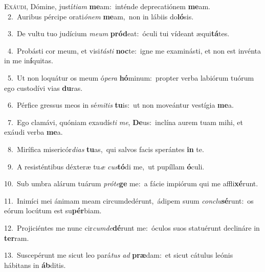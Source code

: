 \lettrine{\initial\textcolor{\initialcolor}{E}}{xáudi,} Dómine, justí\-\textit{ti}\-\textit{am} \textbf{me}\-am:~\star inténde deprecatiónem \textbf{me}\-am.\\
{\numbfont\textcolor{\numbcolor}{~2.}}~Auribus pércipe orati\-\textit{ó}\-\textit{nem} \textbf{me}\-am,~\star non in lábiis do\-\textbf{ló}\-sis.\par
{\numbfont\textcolor{\numbcolor}{~3.}}~De vultu tuo judícium \textit{me}\-\textit{um} \textbf{pród}\-eat:~\star óculi tui vídeant æqui\-\textbf{tá}\-tes.\par
{\numbfont\textcolor{\numbcolor}{~4.}}~Probásti cor meum, et visi\-\textit{tás}\-\textit{ti} \textbf{noc}\-te:~\star igne me examinásti, et non est invénta in me in\-\textbf{í}\-quitas.\par
{\numbfont\textcolor{\numbcolor}{~5.}}~Ut non loquátur os meum ó\-\textit{pe}\-\textit{ra} \textbf{hó}\-minum:~\star propter verba labiórum tuórum ego custodívi vias \textbf{du}\-ras.\par
{\numbfont\textcolor{\numbcolor}{~6.}}~Pérfice gressus meos in sé\-\textit{mi}\-\textit{tis} \textbf{tu}\-is:~\star ut non moveántur vestígia \textbf{me}\-a.\par
{\numbfont\textcolor{\numbcolor}{~7.}}~Ego clamávi, quóniam exaudís\textit{ti} \textit{me}\-, \textbf{De}\-us:~\star inclína aurem tuam mihi, et exáudi verba \textbf{me}\-a.\par
{\numbfont\textcolor{\numbcolor}{~8.}}~Mirífica misericór\-\textit{di}\-\textit{as} \textbf{tu}\-as,~\star qui salvos facis sperántes \textbf{in} te.\par
{\numbfont\textcolor{\numbcolor}{~9.}}~A resisténtibus déxteræ tu\textit{æ} \textit{cus}\-\textbf{tó}di me,~\star ut pupíllam \textbf{ó}\-culi.\par
{\numbfont\textcolor{\numbcolor}{10.}}~Sub umbra alárum tuárum \textit{pró}\-\textit{te}\textbf{ge} me:~\star a fácie impiórum qui me affli\-\textbf{xé}\-runt.\par
{\numbfont\textcolor{\numbcolor}{11.}}~Inimíci mei ánimam meam circumdedérunt,~\dagger ádipem suum \textit{con}\-\textit{clu}\textbf{sé}runt:~\star os eórum locútum est su\-\textbf{pér}\-biam.\par
{\numbfont\textcolor{\numbcolor}{12.}}~Projiciéntes me nunc cir\-\textit{cum}\-\textit{de}\textbf{dé}runt me:~\star óculos suos statuérunt declináre in \textbf{ter}\-ram.\par
{\numbfont\textcolor{\numbcolor}{13.}}~Suscepérunt me sicut leo pará\textit{tus} \textit{ad} \textbf{præ}\-dam:~\star et sicut cátulus leónis hábitans in \textbf{áb}\-ditis.\par

